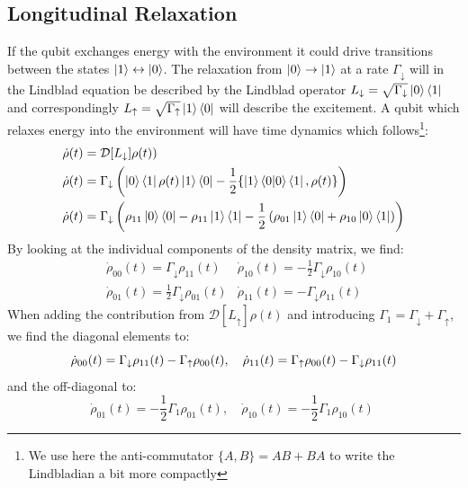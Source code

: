 \subsection{Longitudinal Relaxation}\label{sec:theory_t1}
If the qubit exchanges energy with the environment it could drive transitions between the states $\ket{1} \leftrightarrow \ket{0}$. The relaxation from $\ket{0}\to\ket{1}$ at a rate $\Gamma_\downarrow$ will in the Lindblad equation be described by the Lindblad operator $L_{\downarrow} = \sqrt{\Gamma_{\downarrow}} \ket{0}\bra{1}$ and correspondingly $L{_\uparrow} = \sqrt{\Gamma_{\uparrow}} \ket{1}\bra{0}$ will describe the excitement. A qubit which relaxes energy into the environment will have time dynamics which follows\footnote{We use here the anti-commutator $\{A, B\} = AB + BA$ to write the Lindbladian a bit more compactly}: 
\begin{align*}
    \dot{\rho}(t) &= \mathcal{D}[L_{\downarrow}]\rho(t)) \\
    \dot{\rho}(t) &= \Gamma_\downarrow\left(\ket{0}\bra{1} \rho(t) \ket{1}\bra{0} - \frac12 \{\ket{1}\bra{0}\ket{0}\bra{1}, \rho(t)\}\right) \\
    \dot{\rho}(t) &= \Gamma_\downarrow\left(\rho_{11}\ket{0}\bra{0} - \rho_{11} \ket{1}\bra{1} - \frac12\left(\rho_{01}\ket{1}\bra{0} + \rho_{10}\ket{0}\bra{1}\right)\right)
\end{align*}
By looking at the individual components of the density matrix, we find:
\begin{align*}
    &\dot{\rho}_{00}(t) = \Gamma_\downarrow\rho_{11}(t)  &\dot{\rho}_{10}(t) = -\frac12\Gamma_\downarrow\rho_{10}(t)\; \\   
    &\dot{\rho}_{01}(t) = \frac12 \Gamma_\downarrow\rho_{01}(t)   &\dot{\rho}_{11}(t) = -\Gamma_\downarrow\rho_{11}(t)\;
\end{align*}
When adding the contribution from $\mathcal{D}[L_\uparrow]\rho(t)$ and introducing $\Gamma_1 = \Gamma_\downarrow + \Gamma_\uparrow$, we find the diagonal elements to:
\begin{equation}
    \dot{\rho}_{00}(t) = \Gamma_\downarrow\rho_{11}(t) - \Gamma_\uparrow\rho_{00}(t), \quad \dot{\rho}_{11}(t) = \Gamma_\uparrow\rho_{00}(t)-\Gamma_\downarrow\rho_{11}(t)\; \\   
\end{equation}
and the off-diagonal to:
\begin{equation}
    \dot{\rho}_{01}(t) = -\frac12 \Gamma_1\rho_{01}(t),  \quad \dot{\rho}_{10}(t) = -\frac12\Gamma_1\rho_{10}(t) \;
\end{equation}
